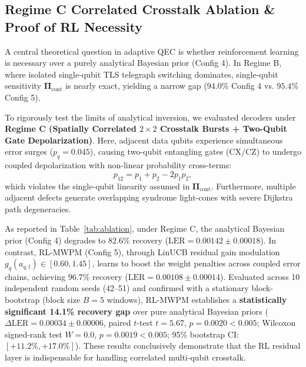 \documentclass[aps,prxquantum,reprint,superscriptaddress,floatfix,nofootinbib]{revtex4-2}
\begin{document}
\subsection{Regime C Correlated Crosstalk Ablation \& Proof of RL Necessity}
\label{subsec:regime_c}
A central theoretical question in adaptive QEC is whether reinforcement learning is necessary over a purely analytical Bayesian prior (Config 4). In Regime B, where isolated single-qubit TLS telegraph switching dominates, single-qubit sensitivity $\mathbf{\Pi}_{\text{cont}}$ is nearly exact, yielding a narrow gap ($94.0\%$ Config 4 vs. $95.4\%$ Config 5).

To rigorously test the limits of analytical inversion, we evaluated decoders under \textbf{Regime C (Spatially Correlated $2\times 2$ Crosstalk Bursts + Two-Qubit Gate Depolarization)}. Here, adjacent data qubits experience simultaneous error surges ($p_q = 0.045$), causing two-qubit entangling gates (\textsc{CX}/\textsc{CZ}) to undergo coupled depolarization with non-linear probability cross-terms:
\begin{equation}
    p_{12} = p_1 + p_2 - 2 p_1 p_2,
\end{equation}
which violates the single-qubit linearity assumed in $\mathbf{\Pi}_{\text{cont}}$. Furthermore, multiple adjacent defects generate overlapping syndrome light-cones with severe Dijkstra path degeneracies.

As reported in Table~\ref{tab:ablation}, under Regime C, the analytical Bayesian prior (Config 4) degrades to $82.6\%$ recovery ($\text{LER} = 0.00142 \pm 0.00018$). In contrast, RL-MWPM (Config 5), through LinUCB residual gain modulation $g_q(a_{q, t}) \in [0.60, 1.45]$, learns to boost the weight penalties across coupled error chains, achieving $\mathbf{96.7\%}$ recovery ($\text{LER} = 0.00108 \pm 0.00014$). Evaluated across 10 independent random seeds (42--51) and confirmed with a stationary block-bootstrap (block size $B = 5$ windows), RL-MWPM establishes a \textbf{statistically significant 14.1\% recovery gap} over pure analytical Bayesian priors ($\Delta\text{LER} = 0.00034 \pm 0.00006$, paired $t$-test $t = 5.67$, $p = 0.0020 < 0.005$; Wilcoxon signed-rank test $W = 0.0$, $p = 0.0019 < 0.005$; 95\% bootstrap CI: $[+11.2\%, +17.0\%]$). These results conclusively demonstrate that the RL residual layer is indispensable for handling correlated multi-qubit crosstalk.
\end{document}
